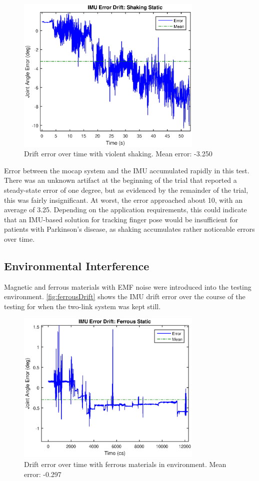 \documentclass[letterpaper, 10 pt, conference]{ieeeconf}  %
\begin{document}
\begin{figure}[thpb]
	\centering
	\includegraphics[width = 3.5in]{shaky_static_drift.eps}
    \caption{Drift error over time with violent shaking. Mean error: -3.250\degree}
    \label{fig:shakingDrift}
\end{figure}

Error between the mocap system and the IMU accumulated rapidly in this test. There was an unknown artifact at the beginning of the trial that reported a steady-state error of one degree, but as evidenced by the remainder of the trial, this was fairly insignificant. At worst, the error approached about 10\degree, with an average of 3.25\degree. Depending on the application requirements, this could indicate that an IMU-based solution for tracking finger pose would be insufficient for patients with Parkinson's disease, as shaking accumulates rather noticeable errors over time.

\subsection{Environmental Interference}

Magnetic and ferrous materials with EMF noise were introduced into the testing environment. \autoref{fig:ferrousDrift} shows the IMU drift error over the course of the testing for when the two-link system was kept still.

\begin{figure}[thpb]
	\centering
	\includegraphics[width = 3.5in]{ferrous_static_drift.eps}
    \caption{Drift error over time with ferrous materials in environment. Mean error: -0.297\degree}
    \label{fig:ferrousDrift}
\end{figure}
\end{document}

